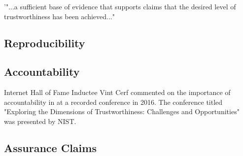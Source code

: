 \documentclass[../../main/main.tex]{subfiles}
\begin{document}
'"...a sufficient base of evidence that supports claims that the desired level of trustworthiness has been achieved..."


\subsection{Reproducibility}\label{ssec:reproducibility}
\subsection{Accountability}\label{ssec:accountability}
Internet Hall of Fame Inductee Vint Cerf commented on the importance of accountability in  at a recorded conference in 2016.  The conference titled "Exploring the Dimensions of Trustworthiness: Challenges and Opportunities" was presented by NIST.  

\subsection{Assurance Claims}\label{ssec:assurance}
\end{document}
